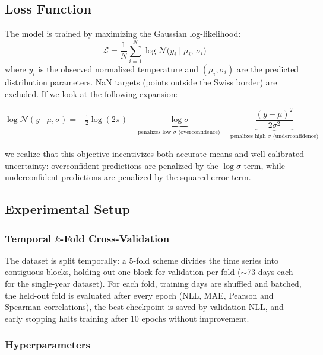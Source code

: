 \subsection{Loss Function}

The model is trained by maximizing the Gaussian log-likelihood:
%
\begin{equation}
    \mathcal{L} = \frac{1}{N}\sum_{i=1}^{N} \log \mathcal{N}\bigl(y_i \mid \mu_i,\, \sigma_i\bigr)
\end{equation}
%
where $y_i$ is the observed normalized temperature and $(\mu_i, \sigma_i)$ are the predicted distribution parameters. NaN targets (points outside the Swiss border) are excluded. If we look at the following expansion:

%
\begin{equation}
    \log \mathcal{N}(y \mid \mu, \sigma) = -\tfrac{1}{2}\log(2\pi) - \underbrace{\log\sigma}_{\text{penalizes low $\sigma$ (overconfidence)}} - \underbrace{\frac{(y - \mu)^2}{2\sigma^2}}_{\text{penalizes high $\sigma$ (underconfidence)}}
\end{equation}
%

we realize that this objective incentivizes both accurate means and well-calibrated uncertainty: overconfident predictions are penalized by the $\log\sigma$ term, while underconfident predictions are penalized by the squared-error term.

\subsection{Experimental Setup}
\label{sec:experimental_setup}

\subsubsection{Temporal $k$-Fold Cross-Validation}

The dataset is split temporally: a 5-fold scheme divides the time series into contiguous blocks, holding out one block for validation per fold (${\sim}$73 days each for the single-year dataset). For each fold, training days are shuffled and batched, the held-out fold is evaluated after every epoch (NLL, MAE, Pearson and Spearman correlations), the best checkpoint is saved by validation NLL, and early stopping halts training after 10 epochs without improvement.

\subsubsection{Hyperparameters}

